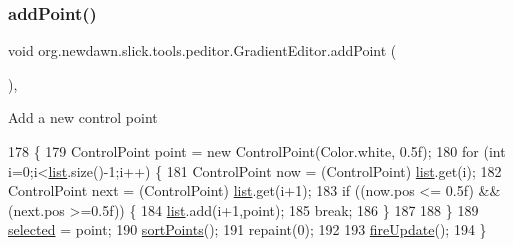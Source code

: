 \subsubsection{\texorpdfstring{add\+Point()}{addPoint()}\hspace{0.1cm}{\footnotesize\ttfamily [1/2]}}
{\footnotesize\ttfamily void org.\+newdawn.\+slick.\+tools.\+peditor.\+Gradient\+Editor.\+add\+Point (\begin{DoxyParamCaption}{ }\end{DoxyParamCaption})\hspace{0.3cm}{\ttfamily [inline]}, {\ttfamily [private]}}

Add a new control point 
\begin{DoxyCode}
178                             \{
179         ControlPoint point = \textcolor{keyword}{new} ControlPoint(Color.white, 0.5f);
180         \textcolor{keywordflow}{for} (\textcolor{keywordtype}{int} i=0;i<\mbox{\hyperlink{classorg_1_1newdawn_1_1slick_1_1tools_1_1peditor_1_1_gradient_editor_aa53704ef8438035eb76c8c6aab8af133}{list}}.size()-1;i++) \{
181             ControlPoint now = (ControlPoint) \mbox{\hyperlink{classorg_1_1newdawn_1_1slick_1_1tools_1_1peditor_1_1_gradient_editor_aa53704ef8438035eb76c8c6aab8af133}{list}}.get(i);
182             ControlPoint next = (ControlPoint) \mbox{\hyperlink{classorg_1_1newdawn_1_1slick_1_1tools_1_1peditor_1_1_gradient_editor_aa53704ef8438035eb76c8c6aab8af133}{list}}.get(i+1);
183             \textcolor{keywordflow}{if} ((now.pos <= 0.5f) && (next.pos >=0.5f)) \{
184                 \mbox{\hyperlink{classorg_1_1newdawn_1_1slick_1_1tools_1_1peditor_1_1_gradient_editor_aa53704ef8438035eb76c8c6aab8af133}{list}}.add(i+1,point);
185                 \textcolor{keywordflow}{break};
186             \}
187             
188         \}
189         \mbox{\hyperlink{classorg_1_1newdawn_1_1slick_1_1tools_1_1peditor_1_1_gradient_editor_a54ab0ad96c4492a2ccfd517dfcfe535b}{selected}} = point;
190         \mbox{\hyperlink{classorg_1_1newdawn_1_1slick_1_1tools_1_1peditor_1_1_gradient_editor_a86a44e97d8aca663dba524a63a28649b}{sortPoints}}();
191         repaint(0);
192         
193         \mbox{\hyperlink{classorg_1_1newdawn_1_1slick_1_1tools_1_1peditor_1_1_gradient_editor_aaafac407b447cb37d6f3c204681382bd}{fireUpdate}}();
194     \}
\end{DoxyCode}
\mbox{\label{classorg_1_1newdawn_1_1slick_1_1tools_1_1peditor_1_1_gradient_editor_a3aa831c1a5141803fd1af2a827a94128}} 
